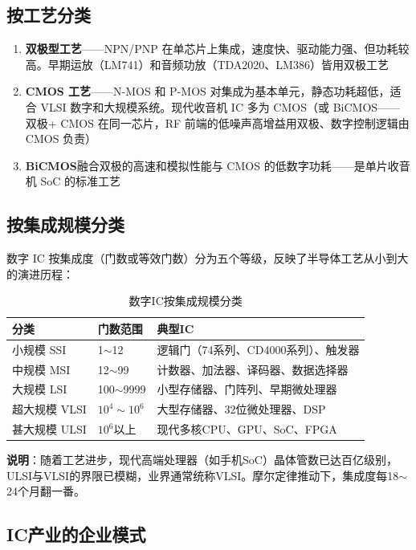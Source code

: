 \documentclass[12pt,UTF8]{ctexbook}
\begin{document}
\subsection{按工艺分类}


\begin{enumerate}
\item \textbf{双极型工艺}——NPN/PNP 在单芯片上集成，速度快、驱动能力强、但功耗较高。早期运放（LM741）和音频功放（TDA2020、LM386）皆用双极工艺
\item \textbf{CMOS 工艺}——N-MOS 和 P-MOS 对集成为基本单元，静态功耗超低，适合 VLSI 数字和大规模系统。现代收音机 IC 多为 CMOS（或 BiCMOS——双极+ CMOS 在同一芯片，RF 前端的低噪声高增益用双极、数字控制逻辑由 CMOS 负责）
\item \textbf{BiCMOS}融合双极的高速和模拟性能与 CMOS 的低数字功耗——是单片收音机 SoC 的标准工艺
\end{enumerate}

\subsection{按集成规模分类}

数字 IC 按集成度（门数或等效门数）分为五个等级，反映了半导体工艺从小到大的演进历程：

\begin{table}[htbp]
\centering
\caption{数字IC按集成规模分类}
\label{tab:ic_scale}
\begin{tabular}{@{}llp{5cm}@{}}
    \toprule
    \textbf{分类} & \textbf{门数范围} & \textbf{典型IC} \\
    \midrule
    小规模 SSI & 1$\sim$12 & 逻辑门（74系列、CD4000系列）、触发器 \\
    中规模 MSI & 12$\sim$99 & 计数器、加法器、译码器、数据选择器 \\
    大规模 LSI & 100$\sim$9999 & 小型存储器、门阵列、早期微处理器 \\
    超大规模 VLSI & $10^4\sim10^6$ & 大型存储器、32位微处理器、DSP \\
    甚大规模 ULSI & $10^6$以上 & 现代多核CPU、GPU、SoC、FPGA \\
    \bottomrule
\end{tabular}
\end{table}

\textbf{说明}：随着工艺进步，现代高端处理器（如手机SoC）晶体管数已达百亿级别，ULSI与VLSI的界限已模糊，业界通常统称VLSI。摩尔定律推动下，集成度每18$\sim$24个月翻一番。

\subsection{IC产业的企业模式}
\end{document}
